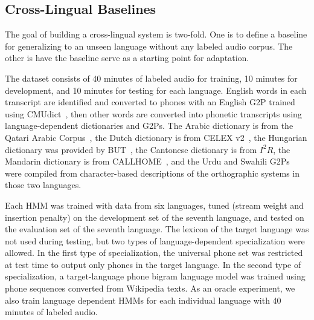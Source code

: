 \subsection{Cross-Lingual Baselines}
\label{sec:mlbaseline}

The goal of building a cross-lingual system is two-fold.
One is to define a baseline for generalizing to an unseen
language without any labeled audio corpus.  The other
is have the baseline serve as a starting point for
adaptation.

The dataset consists of 40 minutes of labeled audio for training,
10 minutes for development, and 10 minutes for testing
for each language.
English words in each transcript are identified and converted to phones with
an English G2P trained using CMUdict~\cite{Lenzo1995}, then
other words are converted into phonetic transcripts using language-dependent
dictionaries and G2Ps.
The Arabic dictionary is from the Qatari Arabic Corpus~\cite{Elmahdy14},
the Dutch dictionary is from CELEX v2~\cite{Baayen96},
the Hungarian dictionary was provided by BUT~\cite{Grezl14},
the Cantonese dictionary is from $I^2R$,
the Mandarin dictionary is from CALLHOME~\cite{LDC96},
and the Urdu and Swahili G2Ps were compiled from
character-based descriptions of the orthographic systems in those
two languages.

Each HMM was trained with data from six languages, tuned
(stream weight and insertion penalty)
on the development set of the seventh language, and
tested on the evaluation set of the seventh language.  The lexicon of
the target language was not used during testing, but two types of
language-dependent specialization were allowed.  In the first type of
specialization, the universal phone set was restricted at test time to
output only phones in the target language.  In the second type of
specialization, a target-language phone bigram language model was
trained using phone sequences converted from Wikipedia texts.
As an oracle experiment, we also train language dependent
HMMs for each individual language with 40 minutes of labeled audio.

